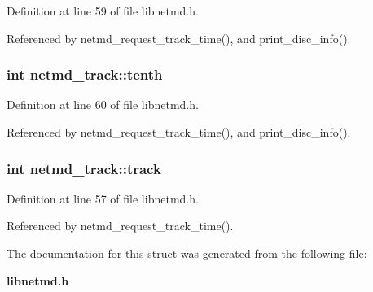 Definition at line 59 of file libnetmd.h.

Referenced by netmd\_\-request\_\-track\_\-time(), and print\_\-disc\_\-info().
\subsubsection[{tenth}]{\setlength{\rightskip}{0pt plus 5cm}int {\bf netmd\_\-track::tenth}}\label{structnetmd__track_a4cf2f392bfff6035ada0a1bcc8afe709}


Definition at line 60 of file libnetmd.h.

Referenced by netmd\_\-request\_\-track\_\-time(), and print\_\-disc\_\-info().
\subsubsection[{track}]{\setlength{\rightskip}{0pt plus 5cm}int {\bf netmd\_\-track::track}}\label{structnetmd__track_af83275917f166f5e88179908d2eb81d0}


Definition at line 57 of file libnetmd.h.

Referenced by netmd\_\-request\_\-track\_\-time().

The documentation for this struct was generated from the following file:\begin{DoxyCompactItemize}
\item 
{\bf libnetmd.h}\end{DoxyCompactItemize}
